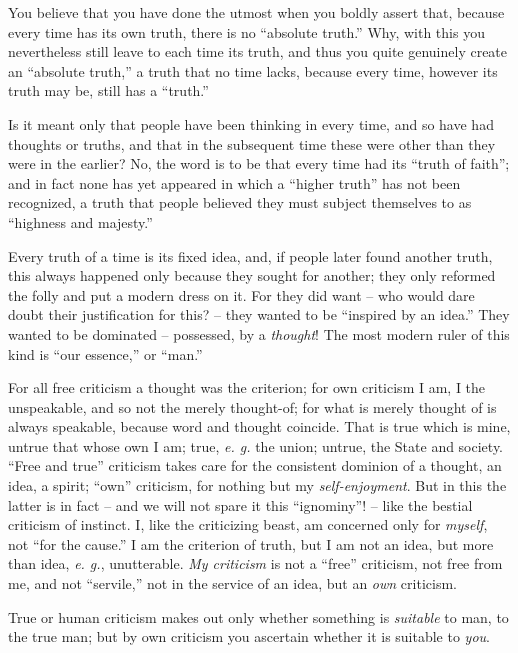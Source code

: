 \documentclass[12pt,a4paper]{book}
\begin{document}
You believe that you have done the utmost when you boldly assert that, because 
every time has its own truth, there is no ``absolute truth.'' Why, with this 
you nevertheless still leave to each time its truth, and thus you quite 
genuinely create an ``absolute truth,'' a truth that no time lacks, because 
every time, however its truth may be, still has a ``truth.''

Is it meant only that people have been thinking in every time, and so have had 
thoughts or truths, and that in the subsequent time these were other than they 
were in the earlier? No, the word is to be that every time had its ``truth of 
faith''; and in fact none has yet appeared in which a ``higher truth'' has 
not been recognized, a truth that people believed they must subject themselves 
to as ``highness and majesty.''

Every truth of a time is its fixed idea, and, if people later found another 
truth, this always happened only because they sought for another; they only 
reformed the folly and put a modern dress on it. For they did want -- who 
would dare doubt their justification for this? -- they wanted to be 
``inspired by an idea.'' They wanted to be dominated -- possessed, by a 
\textit{thought}! The most modern ruler of this kind is ``our essence,'' or 
``man.''

For all free criticism a thought was the criterion; for own criticism I am, I 
the unspeakable, and so not the merely thought-of; for what is merely thought 
of is always speakable, because word and thought coincide. That is true which 
is mine, untrue that whose own I am; true, \textit{e. g.} the union; untrue, 
the State and society. ``Free and true'' criticism takes care for the 
consistent dominion of a thought, an idea, a spirit; ``own'' criticism, for 
nothing but my \textit{self-enjoyment}. But in this the latter is in fact -- 
and we will not spare it this ``ignominy''! -- like the bestial criticism of 
instinct. I, like the criticizing beast, am concerned only for 
\textit{myself}, not ``for the cause.'' I am the criterion of truth, but I 
am not an idea, but more than idea, \textit{e. g.}, unutterable. \textit{My 
criticism} is not a ``free'' criticism, not free from me, and not 
``servile,'' not in the service of an idea, but an \textit{own} criticism.

True or human criticism makes out only whether something is \textit{suitable} 
to man, to the true man; but by own criticism you ascertain whether it is 
suitable to \textit{you}.
\end{document}

